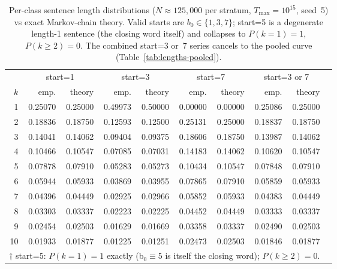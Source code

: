 \documentclass[12pt]{article}
\theoremstyle{definition}
\theoremstyle{remark}
\begin{document}
\begin{table}[!ht]
\centering
\small
\begin{tabular}{rrrrrrrrrr}
\toprule
& \multicolumn{2}{c}{start=1} & \multicolumn{2}{c}{start=3}
& \multicolumn{2}{c}{start=7} & \multicolumn{2}{c}{start=3 or 7} \\
\cmidrule(lr){2-3}\cmidrule(lr){4-5}\cmidrule(lr){6-7}\cmidrule(lr){8-9}
$k$ & emp. & theory & emp. & theory & emp. & theory & emp. & theory \\
\midrule
 1 & 0.25070 & 0.25000 & 0.49973 & 0.50000 & 0.00000 & 0.00000 & 0.25086 & 0.25000 \\
 2 & 0.18836 & 0.18750 & 0.12593 & 0.12500 & 0.25131 & 0.25000 & 0.18837 & 0.18750 \\
 3 & 0.14041 & 0.14062 & 0.09404 & 0.09375 & 0.18606 & 0.18750 & 0.13987 & 0.14062 \\
 4 & 0.10466 & 0.10547 & 0.07085 & 0.07031 & 0.14183 & 0.14062 & 0.10620 & 0.10547 \\
 5 & 0.07878 & 0.07910 & 0.05283 & 0.05273 & 0.10434 & 0.10547 & 0.07848 & 0.07910 \\
 6 & 0.05944 & 0.05933 & 0.03869 & 0.03955 & 0.07865 & 0.07910 & 0.05859 & 0.05933 \\
 7 & 0.04396 & 0.04449 & 0.02925 & 0.02966 & 0.05852 & 0.05933 & 0.04383 & 0.04449 \\
 8 & 0.03303 & 0.03337 & 0.02223 & 0.02225 & 0.04452 & 0.04449 & 0.03333 & 0.03337 \\
 9 & 0.02454 & 0.02503 & 0.01629 & 0.01669 & 0.03358 & 0.03337 & 0.02490 & 0.02503 \\
10 & 0.01933 & 0.01877 & 0.01225 & 0.01251 & 0.02473 & 0.02503 & 0.01846 & 0.01877 \\
\midrule
\multicolumn{9}{l}{%
  \footnotesize$\dagger$ start=5: $P(k=1)=1$ exactly (b$_0\equiv 5$ is itself
  the closing word); $P(k{\geq}2)=0$.
} \\
\bottomrule
\end{tabular}
\caption{Per-class sentence length distributions ($N{\approx}125{,}000$ per stratum,
$T_{\max}=10^{15}$, seed~5) vs exact Markov-chain theory.
Valid starts are $b_0\in\{1,3,7\}$; start=5 is a degenerate length-1 sentence
(the closing word itself) and collapses to $P(k=1)=1$, $P(k{\geq}2)=0$.
The combined start=3 or~7 series cancels to the pooled curve (Table~\ref{tab:lengths-pooled}).}
\label{tab:lengths-stratified}
\end{table}
\end{document}
